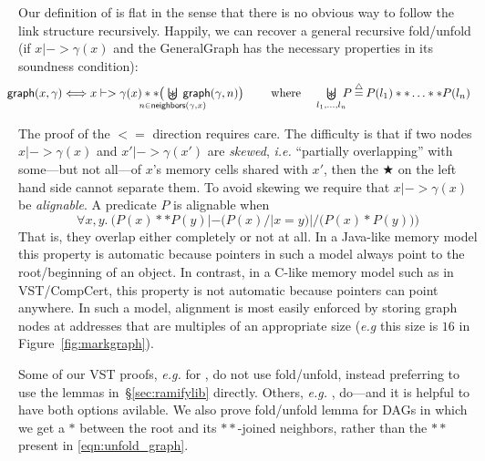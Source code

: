 Our definition of  is flat in the sense that there is no obvious way to follow the link structure recursively.  Happily, we can recover a general recursive fold/unfold (if $x |-> \gamma(x)$ and the GeneralGraph has the necessary properties in its soundness condition):
\vspace{-1ex}
\begin{equation}
\label{eqn:unfold_graph}
\hspace{-1em}\begin{array}{@{}lc@{\hspace{1pt}}c@{\hspace{1pt}}l@{}}
\p{graph}(x,\gamma)  <=>  x |-> \gamma(x) ** \big(\!\!\!\!\!\!\!\!\!\!\!\!\!\underset{n \in \p{neighbors}(\gamma,x)}{\bigocon}\!\!\!\!\!\!\!\!\!\!\!\! \p{graph}(\gamma,n) \big)
\quad \text{~~~ where ~~ }\underset{l_1,\dots,l_n}{\raisebox{-0.3ex}{\resizebox{0.75em}{!}{\hspace{0.05em}$\scon$}}\hspace{-2.18ex} \bigcup} \! \! P  \defeq  P(l_1) ** \ldots ** P(l_n) \end{array}
\vspace{-1ex}
\end{equation}

The proof of the $<=$ direction requires care. The difficulty is that if two nodes $x |-> \gamma(x)$ and $x' |-> \gamma(x')$ are \emph{skewed}, \emph{i.e.} ``partially overlapping'' with some---but not all---of $x$'s memory cells shared with $x'$, then the $\bigstar$ on the left hand side cannot separate them.  To avoid skewing we require that $x |-> \gamma(x)$ be \emph{alignable}. A predicate $P$ is alignable when
\[
\forall x,y.~ \Big(P(x) ** P(y) |- \big(P(x) /| x = y\big) |/ \big(P(x) * P(y)\big)\Big)
\]
That is, they overlap either completely or not at all. In a Java-like memory model this property is automatic because pointers in such a model always point to the root/beginning of an object.  In contrast, in a C-like memory model such as in VST/CompCert, this property is not automatic because pointers can point anywhere.  In such a model, alignment is most easily enforced by storing graph nodes at addresses that are multiples of an appropriate size (\emph{e.g} this size is $16$ in Figure~\ref{fig:markgraph}).

Some of our VST proofs, \emph{e.g.} for , do not use fold/unfold, instead preferring to use the lemmas in~\S\ref{sec:ramifylib} directly.  Others, \emph{e.g.} , do---and it is helpful to have both options avilable. We also prove fold/unfold lemma for DAGs in which we get a $*$ between the root and its $**$-joined neighbors, rather than the $**$ present in \eqref{eqn:unfold_graph}.


